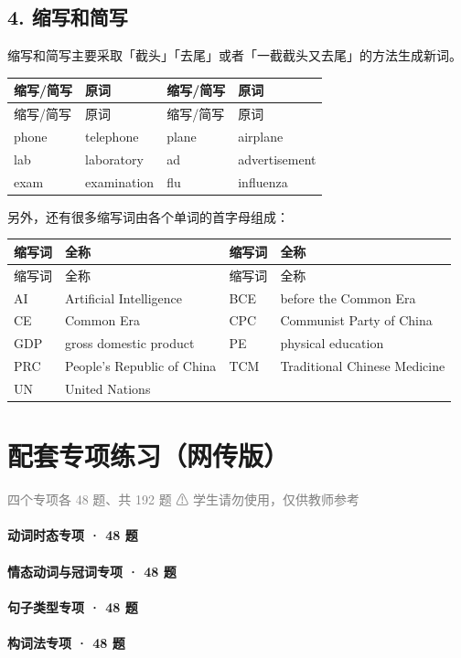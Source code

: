 \documentclass[11pt,a4paper]{ctexart}
\begin{document}
\subsection*{4. 缩写和简写}

缩写和简写主要采取「截头」「去尾」或者「一截截头又去尾」的方法生成新词。

{\footnotesize
\begin{longtable}{p{3.35cm}p{3.35cm}p{3.35cm}p{3.35cm}}
\hline
缩写/简写 & 原词 & 缩写/简写 & 原词 \\
\hline
\endfirsthead
\hline
缩写/简写 & 原词 & 缩写/简写 & 原词 \\
\hline
\endhead
\hline
\endfoot
phone & telephone & plane & airplane \\
lab & laboratory & ad & advertisement \\
exam & examination & flu & influenza \\
\end{longtable}
}

另外，还有很多缩写词由各个单词的首字母组成：

{\footnotesize
\begin{longtable}{p{3.35cm}p{3.35cm}p{3.35cm}p{3.35cm}}
\hline
缩写词 & 全称 & 缩写词 & 全称 \\
\hline
\endfirsthead
\hline
缩写词 & 全称 & 缩写词 & 全称 \\
\hline
\endhead
\hline
\endfoot
AI & Artificial Intelligence & BCE & before the Common Era \\
CE & Common Era & CPC & Communist Party of China \\
GDP & gross domestic product & PE & physical education \\
PRC & People’s Republic of China & TCM & Traditional Chinese Medicine \\
UN & United Nations &  &  \\
\end{longtable}
}

\section{配套专项练习（网传版）}
\noindent\textcolor{gray}{四个专项各 48 题、共 192 题 ⚠ 学生请勿使用，仅供教师参考}\par\smallskip
\paragraph{动词时态专项 · 48 题}

\paragraph{情态动词与冠词专项 · 48 题}

\paragraph{句子类型专项 · 48 题}

\paragraph{构词法专项 · 48 题}

\begin{center}\end{center}
\end{document}
